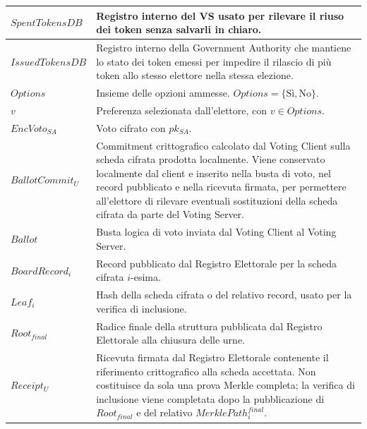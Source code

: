 \documentclass[a4paper,12pt]{article}
\begin{document}
\begin{longtable}{|>{\raggedright\arraybackslash}p{}|>{\raggedright\arraybackslash}p{}|}
	$SpentTokensDB$                       & Registro interno del VS usato per rilevare il riuso dei token senza salvarli in chiaro.                                                                                  \\
	\hline
    $IssuedTokensDB$ & Registro interno della Government Authority che mantiene lo stato dei token emessi per impedire il rilascio di più token allo stesso elettore nella stessa elezione. \\
    \hline
	$Options$                             & Insieme delle opzioni ammesse. $Options = \{\text{Sì}, \text{No}\}$.                                                                                      \\
	\hline
	$v$                                   & Preferenza selezionata dall'elettore, con $v \in Options$.                                                                                                               \\
	\hline
	$EncVoto_{SA}$                        & Voto cifrato con $pk_{SA}$.                                                                                                                                              \\
    $BallotCommit_U$ & Commitment crittografico calcolato dal Voting Client sulla scheda cifrata prodotta localmente. Viene conservato localmente dal client e inserito nella busta di voto, nel record pubblicato e nella ricevuta firmata, per permettere all'elettore di rilevare eventuali sostituzioni della scheda cifrata da parte del Voting Server. \\

	\hline
	$Ballot$                              & Busta logica di voto inviata dal Voting Client al Voting Server.                                                                                                         \\
	\hline
	$BoardRecord_i$                       & Record pubblicato dal Registro Elettorale per la scheda cifrata $i$-esima.                                                                                               \\
	\hline
	$Leaf_i$                              & Hash della scheda cifrata o del relativo record, usato per la verifica di inclusione.                                                                                    \\
	\hline
	$Root_{final}$                        & Radice finale della struttura pubblicata dal Registro Elettorale alla chiusura delle urne.                                                                               \\
	\hline
	\(Receipt_U\) & Ricevuta firmata dal Registro Elettorale contenente il riferimento crittografico alla scheda accettata. Non costituisce da sola una prova Merkle completa; la verifica di inclusione viene completata dopo la pubblicazione di \(Root_{final}\) e del relativo \(MerklePath_i^{final}\).                                   \\
	\hline
\end{longtable}
\end{document}
